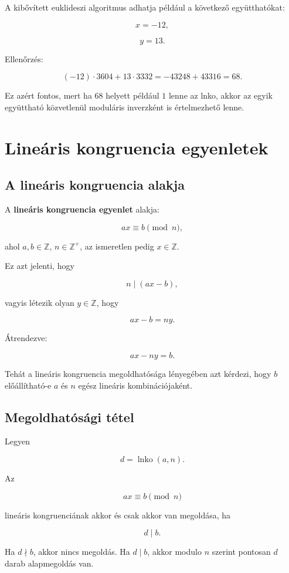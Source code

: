 A kibővített euklideszi algoritmus adhatja például a következő együtthatókat:

\[
x=-12,
\]

\[
y=13.
\]

Ellenőrzés:

\[
(-12)\cdot3604+13\cdot3332=-43248+43316=68.
\]

Ez azért fontos, mert ha $68$ helyett például $1$ lenne az lnko, akkor az egyik együttható közvetlenül moduláris inverzként is értelmezhető lenne.

\section{Lineáris kongruencia egyenletek}

\subsection{A lineáris kongruencia alakja}

A \textbf{lineáris kongruencia egyenlet} alakja:

\[
a x\equiv b\pmod n,
\]

ahol $a,b\in\mathbb{Z}$, $n\in\mathbb{Z}^{+}$, az ismeretlen pedig $x\in\mathbb{Z}$.

Ez azt jelenti, hogy

\[
n\mid(ax-b),
\]

vagyis létezik olyan $y\in\mathbb{Z}$, hogy

\[
ax-b=ny.
\]

Átrendezve:

\[
ax-ny=b.
\]

Tehát a lineáris kongruencia megoldhatósága lényegében azt kérdezi, hogy $b$ előállítható-e $a$ és $n$ egész lineáris kombinációjaként.

\subsection{Megoldhatósági tétel}

Legyen

\[
d=\operatorname{lnko}(a,n).
\]

Az

\[
ax\equiv b\pmod n
\]

lineáris kongruenciának akkor és csak akkor van megoldása, ha

\[
d\mid b.
\]

Ha $d\nmid b$, akkor nincs megoldás. Ha $d\mid b$, akkor modulo $n$ szerint pontosan $d$ darab alapmegoldás van.

